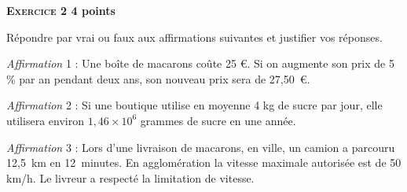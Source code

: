 \textbf{\textsc{Exercice 2} \hfill 4 points}

\medskip

Répondre par vrai ou faux aux affirmations suivantes et justifier vos réponses.

\medskip

\emph{Affirmation }1 : Une boîte de macarons coûte 25 \euro. Si on augmente son prix de 5\,\% par an
pendant deux ans, son nouveau prix sera de 27,50~\euro.

\medskip

\emph{Affirmation }2 : Si une boutique utilise en moyenne 4 kg de sucre par jour, elle utilisera environ
$1,46 \times 10^6$ grammes de sucre en une année.

\medskip

\emph{Affirmation }3 : Lors d'une livraison de macarons, en ville, un camion a parcouru 12,5~km en 12~minutes. En agglomération la vitesse maximale autorisée est de 50 km/h. Le livreur a respecté la
limitation de vitesse.

\bigskip

